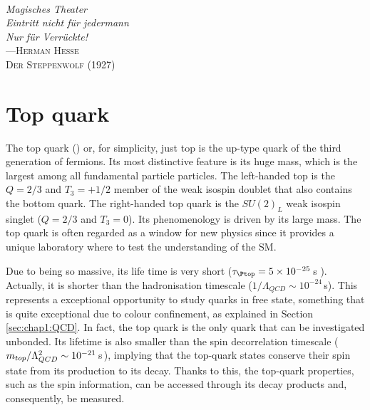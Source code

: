 \vspace*{0.1 cm} 
\hspace*{200pt} \\
\hspace*{120pt} \textit{Magisches Theater} \\
\hspace*{120pt} \textit{Eintritt nicht für jedermann} \\
\hspace*{120pt} \textit{Nur für Verrückte!} \\
\hspace*{140pt} ---\textsc{Herman Hesse } \\%
\hspace*{165pt}     \textsc{Der Steppenwolf (1927)} \\%
\vspace*{2cm} 


\section{Top quark}
\label{sec:Chap1:Top}
The top
quark (\Ptop) or, for simplicity, just top is the up-type quark of the third generation of fermions.
Its most distinctive feature is its huge mass, which is the largest among all %
fundamental particle particles. 
The left-handed top is the $Q=2/3$ and $T_{3} = +1/2$ member of the weak isospin
doublet that also contains the bottom quark. The right-handed top quark is the $SU(2)_{L}$
weak isospin singlet ($Q=2/3$ and $T_{3} = 0$). %
Its phenomenology is driven by its large mass. 
The top quark is often regarded  as a window for new physics
since it provides a unique laboratory where to test the understanding of the SM. 

Due to being so massive, its life time is very short ($\tau_{\Ptop} = 5 \times 10^{-25}\,$s \cite{Taylor:1998uk}). 
Actually, it is shorter than the hadronisation timescale ($1/\Lambda_{QCD} \sim 10^{-24}\,$s).
This represents a exceptional opportunity to study quarks in free state, something that is quite exceptional
due to colour confinement, as explained  in Section \ref{sec:chap1:QCD}. 
In fact, the top quark is the only quark that can be investigated unbonded.
Its lifetime is also smaller than the spin decorrelation timescale ($m_{top} /\Lambda^{2}_{QCD} \sim 10^{-21}\,$s$\,$\cite{Mahlon:2010gw}),
implying that the top-quark states conserve their spin state from its production to its decay.
Thanks to this, the top-quark properties, such as the spin information, can be accessed through its decay 
products and, consequently, be measured. %


